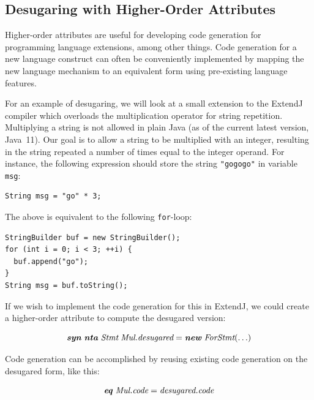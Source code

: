 \documentclass[10pt, twoside, openright]{book}
\begin{document}
\vspace{0.5em}
\subsection{Desugaring with Higher-Order Attributes}

Higher-order attributes are useful for developing code generation for programming
language extensions, among other things.
Code generation for a new language construct can often be conveniently implemented by mapping the
new language mechanism to an equivalent form using pre-existing language features.

For an example of desugaring, we will look at a small extension to the ExtendJ compiler
which overloads the multiplication operator for string repetition.
Multiplying a string is not allowed in plain Java (as of the current latest version,
Java~11). Our goal is to allow a string to be multiplied with an integer, resulting
in the string repeated a number of times equal to the integer operand.
For instance, the following
expression should store the string \verb'"gogogo"' in variable \verb'msg':

\begin{lstlisting}
String msg = "go" * 3;
\end{lstlisting}

\noindent
The above is equivalent to the following \verb'for'-loop:

\begin{lstlisting}
StringBuilder buf = new StringBuilder();
for (int i = 0; i < 3; ++i) {
  buf.append("go");
}
String msg = buf.toString();
\end{lstlisting}

\noindent
If we wish to implement the code generation for this in ExtendJ,
we could create a higher-order attribute to compute the desugared version:


\begin{equation*}
\textbf{\textit{syn}} \; \textbf{\textit{nta}} \; \textit{Stmt} \; \textit{Mul.desugared} = \textbf{\textit{new}} \; \textit{ForStmt}(\ldots)
\end{equation*}

\noindent
Code generation can be accomplished by reusing existing code generation on the
desugared form, like this:

\begin{equation*}
\textbf{\textit{eq}} \; \textit{Mul.code} = \textit{desugared.code}
\end{equation*}
\end{document}
